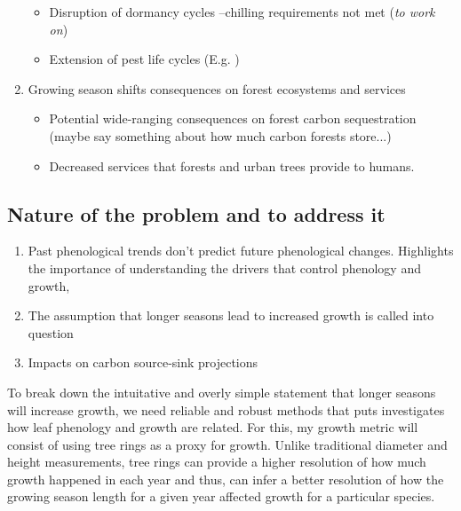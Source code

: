 \documentclass{article}
\begin{document}
\begin{enumerate}
\begin {itemize}
				\item Disruption of dormancy cycles --chilling requirements not met (\textit{to work on})
				\item Extension of pest life cycles (E.g. \cite{bentz_western_2023})
			\end {itemize}
	\item Growing season shifts consequences on forest ecosystems and services
		\begin {itemize}
			\item Potential wide-ranging consequences on forest carbon sequestration (maybe say something about how much carbon forests store...)
			\item Decreased services that forests and urban trees provide to humans.
		\end {itemize}
\end{enumerate}

\subsection{Nature of the problem and to address it}  %
\begin{enumerate}
	\item Past phenological trends don't predict future phenological changes. Highlights the importance of understanding the drivers that control phenology and growth,
	\item The assumption that longer seasons lead to increased growth is called into question
	\item Impacts on carbon source-sink projections
\end{enumerate} %
To break down the intuitative and overly simple statement that longer seasons will increase growth, we need reliable and robust methods that puts investigates how leaf phenology and growth are related. For this, my growth metric will consist of using tree rings as a proxy for growth. Unlike traditional diameter and height measurements, tree rings can provide a higher resolution of how much growth happened in each year and thus, can infer a better resolution of how the growing season length for a given year affected growth for a particular species. 
\end{document}
